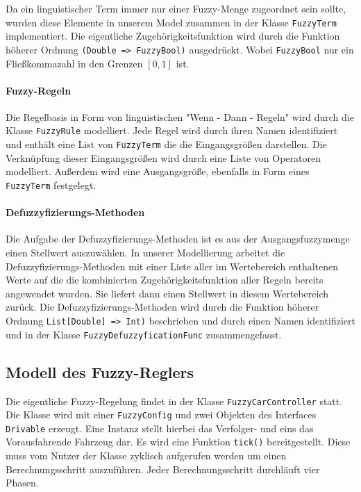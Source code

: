 \documentclass[12pt,a4paper,bibliography=totocnumbered,listof=totocnumbered, abstracton]{scrartcl}
\def\code#1{\texttt{#1}}
\theoremstyle{Umgebung}
\begin{document}
Da ein linguistischer Term immer nur einer Fuzzy-Menge zugeordnet sein sollte, wurden diese Elemente in unserem Model zusammen in der Klasse \code{FuzzyTerm} implementiert. Die eigentliche Zugehörigkeitsfunktion wird durch die Funktion höherer Ordnung \code{(Double => FuzzyBool)} ausgedrückt. Wobei \code{FuzzyBool} nur ein Fließkommazahl in den Grenzen $\left[0,1\right]$ ist.

\paragraph{Fuzzy-Regeln}

Die Regelbasis in Form von linguistischen "Wenn - Dann - Regeln" wird durch die Klasse \code{FuzzyRule} modelliert. Jede Regel wird durch ihren Namen identifiziert und enthält eine List von \code{FuzzyTerm} die die Eingangsgrößen darstellen. Die Verknüpfung dieser Eingangsgrößen wird durch eine Liste von Operatoren modelliert. Außerdem wird eine Ausgangsgröße, ebenfalls in Form eines \code{FuzzyTerm} festgelegt.

\paragraph{Defuzzyfizierungs-Methoden}

Die Aufgabe der Defuzzyfizierungs-Methoden ist es aus der Ausgangsfuzzymenge einen Stellwert auszuwählen. In unserer Modellierung arbeitet die Defuzzyfizierungs-Methoden mit einer Liste aller im Wertebereich enthaltenen Werte auf die die kombinierten Zugehörigkeitsfunktion aller Regeln bereits angewendet wurden. Sie liefert dann einen Stellwert in diesem Wertebereich zurück. Die Defuzzyfizierungs-Methoden wird durch die Funktion höherer Ordnung \code{List[Double] => Int)} beschrieben und durch einen Namen identifiziert und in der Klasse \code{FuzzyDefuzzyficationFunc} zusammengefasst.

\subsection{Modell des Fuzzy-Reglers}

Die eigentliche Fuzzy-Regelung findet in der Klasse \code{FuzzyCarController} statt. Die Klasse wird mit einer \code{FuzzyConfig} und zwei Objekten des Interfaces \code{Drivable} erzeugt. Eine Instanz stellt hierbei das Verfolger- und eins das Vorausfahrende Fahrzeug dar. Es wird eine Funktion \code{tick()} bereitgestellt. Diese muss vom Nutzer der Klasse zyklisch aufgerufen werden um einen Berechnungsschritt auszuführen. Jeder Berechnungsschritt durchläuft vier Phasen.
\end{document}
